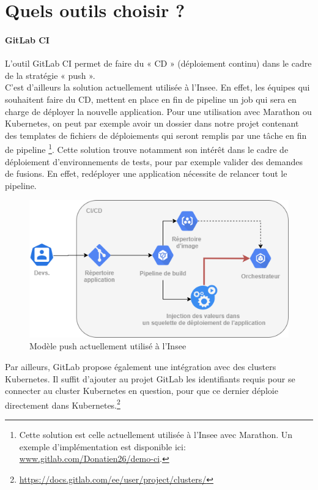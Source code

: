 \documentclass[11pt,fleqn]{book} %
\begin{document}
\section{Quels outils choisir ?}
\paragraph{GitLab CI}
L'outil GitLab CI permet de faire du « CD » (déploiement continu) dans le cadre de la stratégie « push ». \\

C’est d'ailleurs la solution actuellement utilisée à l'Insee. En effet, les équipes qui souhaitent faire du CD, mettent en place en fin de pipeline un job qui sera en charge de déployer la nouvelle application. Pour une utilisation avec Marathon ou Kubernetes, on peut par exemple avoir un dossier dans notre projet contenant des templates de fichiers de déploiements qui seront remplis par une tâche en fin de pipeline \footnote{Cette solution est celle actuellement utilisée à l'Insee avec Marathon. Un exemple d'implémentation est disponible ici: \url{www.gitlab.com/Donatien26/demo-ci}.}. Cette solution trouve notamment son intérêt dans le cadre de déploiement d'environnements de tests, pour par exemple valider des demandes de fusions. En effet, redéployer une application nécessite de relancer tout le pipeline.\\

\begin{figure}[H]\centering
\renewcommand{\figurename}{Schéma}
\includegraphics[scale=0.55]{Pictures/CI-CD/insee-model.png}
\captionsetup{margin=1.5cm,format=hang,justification=justified}
\caption[]{Modèle push actuellement utilisé à l'Insee \newline}
\end{figure}

Par ailleurs, GitLab propose également une intégration avec des clusters Kubernetes. Il suffit d’ajouter au projet GitLab les identifiants requis pour se connecter au cluster Kubernetes en question, pour que ce dernier déploie directement dans Kubernetes.\footnote{\url{https://docs.gitlab.com/ee/user/project/clusters/}}
\end{document}
